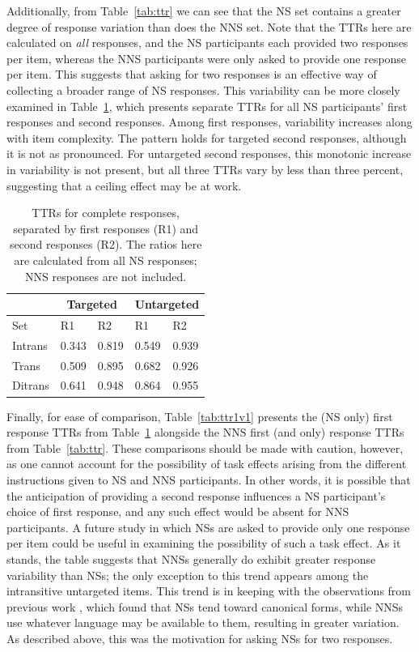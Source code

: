 Additionally, from Table~\ref{tab:ttr} we can see that the NS set contains a greater degree of response variation than does the NNS set. Note that the TTRs here are calculated on \textit{all} responses, and the NS participants each provided two responses per item, whereas the NNS participants were only asked to provide one response per item. This suggests that asking for two responses is an effective way of collecting a broader range of NS responses. This variability can be more closely examined in Table~\ref{tab:ttr1v2}, which presents separate TTRs for all NS participants' first responses and second responses. Among first responses, variability increases along with item complexity. The pattern holds for targeted second responses, although it is not as pronounced. For untargeted second responses, this monotonic increase in variability is not present, but all three TTRs vary by less than three percent, suggesting that a ceiling effect may be at work.

\begin{table}[hb!]
\begin{center}
\begin{tabular}{|l||l|l||l|l|}
\hline
 & \multicolumn{2}{|c||}{Targeted} & \multicolumn{2}{|c|}{Untargeted} \\
\hline
 Set & R1 & R2 & R1 & R2 \\
\hline
\hline
Intrans & 0.343 & 0.819 & 0.549 & 0.939 \\
\hline
Trans & 0.509 & 0.895 & 0.682 & 0.926 \\ %
\hline
Ditrans & 0.641 & 0.948 & 0.864 & 0.955  \\ 
\hline
\end{tabular}
\caption{\label{tab:ttr1v2} TTRs for complete responses, separated by first responses (R1) and second responses (R2). The ratios here are calculated from all NS responses; NNS responses are not included.}
\end{center}
\end{table}

Finally, for ease of comparison, Table~\ref{tab:ttr1v1} presents the (NS only) first response TTRs from Table~\ref{tab:ttr1v2} alongside the NNS first (and only) response TTRs from Table~\ref{tab:ttr}. These comparisons should be made with caution, however, as one cannot account for the possibility of task effects arising from the different instructions given to NS and NNS participants. In other words, it is possible that the anticipation of providing a second response influences a NS participant's choice of first response, and any such effect would be absent for NNS participants. A future study in which NSs are asked to provide only one response per item could be useful in examining the possibility of such a task effect. As it stands, the table suggests that NNSs generally do exhibit greater response variability than NSs; the only exception to this trend appears among the intransitive untargeted items. This trend is in keeping with the observations from previous work \citep{king:dickinson:13}, which found that NSs tend toward canonical forms, while NNSs use whatever language may be available to them, resulting in greater variation. As described above, this was the motivation for asking NSs for two responses.


